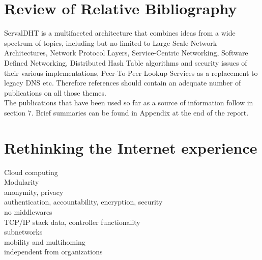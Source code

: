 \documentclass[12pt,a4paper,oneside]{article}
\begin{document}
\newpage
\section{Review of Relative Bibliography}
ServalDHT is a multifaceted architecture that combines ideas from a wide spectrum of topics, including but no limited to Large Scale Network Architectures, Network Protocol Layers, Service-Centric Networking, Software Defined Networking, Distributed Hash Table algorithms and security issues of their various implementations, Peer-To-Peer Lookup Services as a replacement to legacy DNS etc. Therefore references should contain an adequate number of publications on all those themes.\\
\indent The publications that have been used so far as a source of information follow in section 7. Brief summaries can be found in Appendix at the end of the report.


\newpage
\section{Rethinking the Internet experience}
Cloud computing
\\Modularity
\\anonymity, privacy
\\authentication, accountability, encryption, security
\\no middlewares
\\TCP/IP stack data, controller functionality
\\subnetworks
\\mobility and multihoming
\\independent from organizations


\newpage
\end{document}
